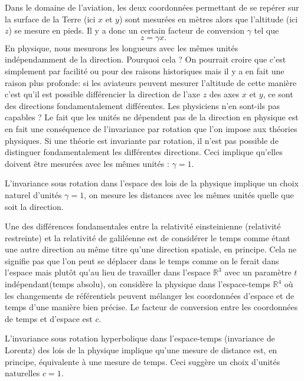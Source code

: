         Dans le domaine de l'aviation, les deux coordonnées permettant de se repérer sur la surface de la Terre (ici $x$ et $y$) sont mesurées en mètres alors que l'altitude (ici $z$) se mesure en pieds. Il y a donc un certain facteur de conversion $\gamma$ tel que 
        \begin{equation}
            z = \gamma x.
        \end{equation}
        En physique, nous mesurons les longueurs avec les mêmes unités indépendamment de la direction. Pourquoi cela ? On pourrait croire que c'est simplement par facilité ou pour des raisons historiques mais il y a en fait une raison plus profonde: si les aviateurs peuvent mesurer l'altitude de cette manière c'est qu'il est possible différencier la direction de l'axe $z$ des axes $x$ et $y$, ce sont des directions fondamentalement différentes. Les physiciens n'en sont-ils pas capables ? Le fait que les unités ne dépendent pas de la direction en physique est en fait une conséquence de l'invariance par rotation que l'on impose aux théories physiques. Si une théorie est invariante par rotation, il n'est pas possible de distinguer fondamentalement les différentes directions. Ceci implique qu'elles doivent être mesurées avec les mêmes unités : $\gamma=1$.
        
        \begin{leftbar}
            L'invariance sous rotation dans l'espace des lois de la physique implique un choix naturel d'unités $\gamma = 1$, on mesure les distances avec les mêmes unités quelle que soit la direction.
        \end{leftbar}
        
        Une des différences fondamentales entre la relativité einsteinienne (relativité restreinte) et la relativité de galiléenne est de considérer le temps comme étant une autre direction au même titre qu'une direction spatiale, en principe. Cela ne signifie pas que l'on peut se déplacer dans le temps comme on le ferait dans l'espace mais plutôt qu'au lieu de travailler dans l'espace $\mathbb{R}^3$ avec un paramètre $t$ indépendant(temps absolu), on considère la physique dans l'espace-temps $\mathbb{R}^4$ où les changements de référentiels peuvent mélanger les coordonnées d'espace et de temps d'une manière bien précise. Le facteur de conversion entre les coordonnées de temps et d'espace est $c$.
        
        \begin{leftbar}
            L'invariance sous rotation hyperbolique dans l'espace-temps (invariance de Lorentz) des lois de la physique implique qu'une mesure de distance est, en principe, équivalente à une mesure de temps. Ceci suggère un choix d'unités naturelles $c=1$.
        \end{leftbar}
        
